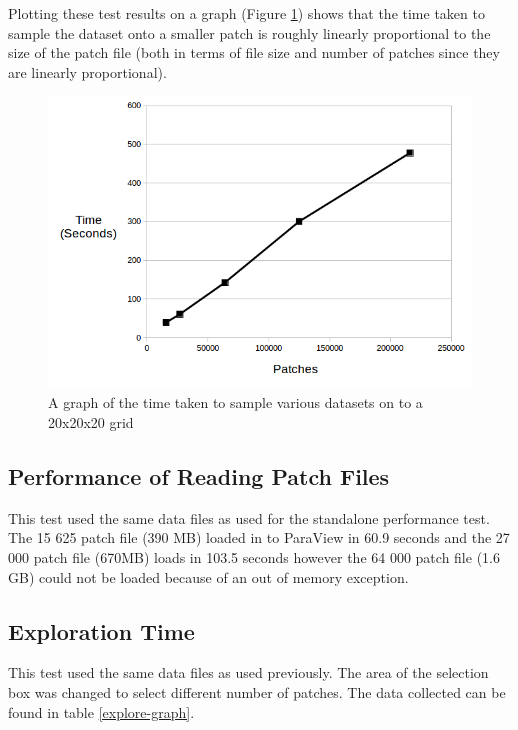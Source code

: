 \documentclass[12pt,a4paper]{article}
\begin{document}
Plotting these test results on a graph (Figure \ref{standalone-time-graph}) shows that the time taken to sample the dataset onto a smaller patch is roughly linearly proportional to the size of the patch file (both in terms of file size and number of patches since they are linearly proportional).

\begin{figure}[h]
\centering
\includegraphics[scale=0.8]{standalone-time-graph2}
\caption{A graph of the time taken to sample various datasets on to a 20x20x20 grid}
\label{standalone-time-graph}
\end{figure}

\subsection{Performance of Reading Patch Files}
This test used the same data files as used for the standalone performance test. The 15 625 patch file (390 MB) loaded in to ParaView in 60.9 seconds and the 27 000 patch file (670MB) loads in 103.5 seconds however the 64 000 patch file (1.6 GB) could not be loaded because of an out of memory exception.

\subsection{Exploration Time}
This test used the same data files as used previously. The area of the selection box was changed to select different number of patches. The data collected can be found in table \ref{explore-graph}.
\end{document}
